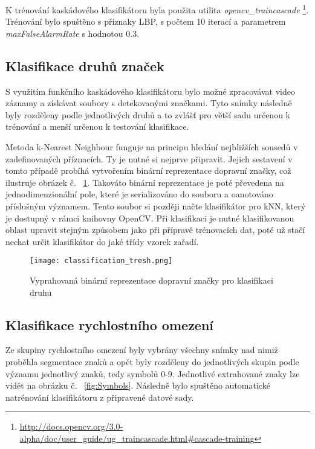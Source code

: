 \documentclass[czech]{ExcelAtFIT} %
\begin{document}
K trénování kaskádového klasifikátoru byla použita utilita \emph{opencv\_traincascade}%
\footnote{\url{http://docs.opencv.org/3.0-alpha/doc/user\_guide/ug\_traincascade.html\#cascade-training}}. Trénování bylo spuštěno s příznaky LBP, s počtem 10 iterací a parametrem \emph{\mbox{maxFalseAlarmRate}} s hodnotou 0.3.

\subsection{Klasifikace druhů značek}
S využitím funkčního kaskádového klasifikátoru bylo možné zpracovávat video záznamy a získávat soubory s detekovanými značkami. Tyto snímky následně byly rozděleny podle jednotlivých druhů a to zvlášť pro větší sadu určenou k trénování a menší určenou k testování klasifikace.

Metoda k-Nearest Neighbour funguje na principu hledání nejbližších sousedů v zadefinovaných příznacích. Ty je nutné si nejprve připravit. Jejich sestavení v tomto případě probíhá vytvořením binární reprezentace dopravní značky, což ilustruje obrázek č. ~\ref{fig:ClassificationTreshold}. Takováto binární reprezentace je poté převedena na jednodimenzionální pole, které je serializováno do souboru a oanotováno příslušným významem. Tento soubor si později načte klasifikátor pro kNN, který je dostupný v rámci knihovny OpenCV. Při klasifikaci je nutné klasifikovanou oblast upravit stejným způsobem jako při přípravě trénovacích dat, poté už stačí nechat určit klasifikátor do jaké třídy vzorek zařadí.

\begin{figure}[t]
\centering
\texttt{[image: classification\_tresh.png]}\\[1pt]
\caption{Vyprahovaná binární reprezentace dopravní značky pro klasifikaci druhu}
\label{fig:ClassificationTreshold}
\end{figure}

\subsection{Klasifikace rychlostního omezení}
\label{sec:Keywords}
Ze skupiny rychlostního omezení byly vybrány všechny snímky nad nimiž proběhla segmentace znaků a opět byly rozděleny do jednotlivých skupin podle významu jednotlivý znaků, tedy symbolů 0-9. Jednotlivé extrahované znaky lze vidět na obrázku č. ~\ref{fig:Symbols}. Následně bylo spuštěno automatické natrénování klasifikátoru z při\-pravené datové sady.
\end{document}
